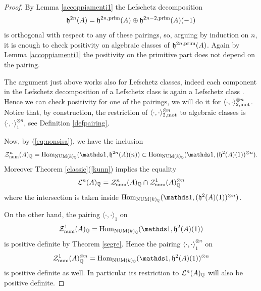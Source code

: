 \begin{proof}
By Lemma \ref{accoppiamenti1} the Lefschetz decomposition \[\mathfrak{h}^{2n}(A) = \mathfrak{h}^{2n,\mathrm{prim}}(A) \oplus \mathfrak{h}^{2n-2,\mathrm{prim}}(A) (-1)\] is orthogonal with respect to any of these pairings, so, arguing by induction on $n$, it is enough to check positivity on algebraic classes of $ \mathfrak{h}^{2n,\mathrm{prim}}(A)$. Again by Lemma \ref{accoppiamenti1} the positivity on the primitive part does not depend on the pairing.



The argument just above works also for Lefschetz classes, indeed each component in the Lefschetz decomposition of a Lefschetz class is again a Lefschetz class  \cite[p. 640]{Milnelef}. Hence we can check positivity for one of the pairings, we will do it for $\langle \cdot, \cdot \rangle_{2,\mathrm{mot}}^{\otimes n}$. Notice that, by construction, the restriction of $\langle \cdot, \cdot \rangle_{2,\mathrm{mot}}^{\otimes n}$ to algebraic classes is $\langle \cdot, \cdot \rangle_{1}^{\otimes n}$, see Definition \ref{defpairing}.


Now, by (\ref{eq:nonsisa}), we have the inclusion
 \[\mathcal{Z}^n_{\num}(A)_{\Q}=\Hom_{\NUM(k)_\Q}(\one, \mathfrak{h}^{2n}(A)(n)) \subset  \Hom_{\NUM(k)_\Q}(\one,(\mathfrak{h}^2(A)(1))^{\otimes n}).\]
 Moreover Theorem \ref{classic}(\ref{kunn})   implies the equality
 \[\mathcal{L}^{n}(A)_{\mathbb{Q}} = \mathcal{Z}^n_{\mathrm{num}}(A)_{\mathbb{Q}} \cap \mathcal{Z}^1_{\mathrm{num}}(A)_{\mathbb{Q}}^{\otimes n}\]
 where the intersection is taken inside  $\Hom_{\NUM(k)_\Q}(\one,(\mathfrak{h}^2(A)(1))^{\otimes n})$.

On the other hand, the pairing $\langle \cdot, \cdot \rangle_1$ on \[\mathcal{Z}^1_{\num}(A)_{\Q}= \Hom_{\NUM(k)_\Q}(\one, \mathfrak{h}^2(A)(1))\]
is positive definite by Theorem \ref{segre}. Hence the pairing $\langle \cdot, \cdot \rangle_1^{\otimes n}$ on \[\mathcal{Z}^1_{\num}(A)^{\otimes n}_{\Q} = \Hom_{\NUM(k)_\Q}(\one, \mathfrak{h}^2(A)(1))^{\otimes n}\] is positive definite as well. In particular its restriction to $\mathcal{L}^{n}(A)_{\mathbb{Q}}$ will also be positive definite. \end{proof}
